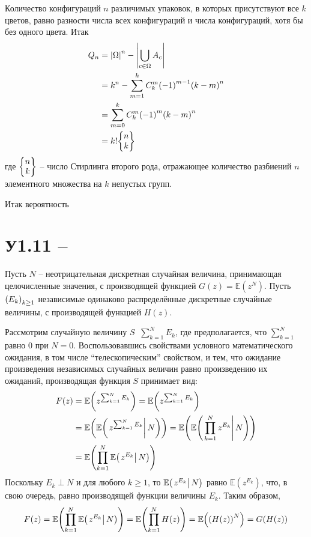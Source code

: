 \documentclass[a4paper]{article}
\let\originalleft\left
\let\originalright\right
\renewcommand{\left}{\mathopen{}\mathclose\bgroup\originalleft}
\renewcommand{\right}{\aftergroup\egroup\originalright}
\newcommand{\brac}[1]{{\left ( #1 \right )}}
\newcommand{\induc}[1]{{\left . #1 \right \vert}}
\newcommand{\abs}[1]{{\left | #1 \right |}}
\newcommand{\Ex}[0]{{\mathbb{E}}}
\newcommand{\defn}{{\mathop{\overset{\Delta}{=}}\nolimits}}
\begin{document}
Количество конфигураций $n$ различимых упаковок, в которых присутствуют все $k$ цветов,
равно разности числа всех конфигураций и числа конфигураций, хотя бы без одного цвета.
Итак
\begin{align*}
	Q_n & = \abs{\Omega}^n - \abs{ \bigcup_{c\in \Omega} A_c } \\
	& = k^n - \sum_{m=1}^k C^m_k {(-1)}^{m-1} {(k - m)}^n \\
	& = \sum_{m=0}^k C^m_k {(-1)}^m {(k - m)}^n \\
	& = k! \left\{\begin{matrix} n \\ k \end{matrix}\right\}
\end{align*}
где $\left\{\begin{matrix} n \\ k \end{matrix}\right\}$ -- число Стирлинга второго рода,
отражающее количество разбиений $n$ элементного множества на $k$ непустых групп.

Итак вероятность 





\section{У1.11 -- } %
\label{sec:task_1_11}

Пусть $N$ -- неотрицательная дискретная случайная величина, принимающая
целочисленные значения, с производящей функцией $G(z) = \Ex(z^N)$.
Пусть $\brac{E_k}_{k\geq 1}$ независимые одинаково распределённые дискретные
случайные величины, с производящей функцией $H(z)$.

Рассмотрим случайную величину $S \defn \sum_{k=1}^N E_k$, где предполагается,
что $\sum_{k=1}^N$ равно $0$ при $N=0$. Воспользовавшись свойствами условного
математического ожидания, в том числе ``телескопическим'' свойством, и тем,
что ожидание произведения независимых случайных величин равно произведению
их ожиданий, производящая функция $S$ принимает вид:
\begin{align*}
	F(z) &= \Ex\brac{ z^{\sum_{k=1}^N E_k} }
	= \Ex\brac{ z^{\sum_{k=1}^N E_k} } \\
	& = \Ex\brac{ \Ex\brac{\induc{z^{\sum_{k=1}^N E_k} }\,N} }
	= \Ex\brac{ \Ex\brac{\induc{\prod_{k=1}^N z^{E_k} }\,N} } \\
	& = \Ex\brac{ \prod_{k=1}^N \Ex\brac{\induc{z^{E_k} }\,N} }
\end{align*}
Поскольку $E_k\perp N$ и для любого $k\geq 1$, то $\Ex\brac{\induc{z^{E_k} }\,N}$
равно $\Ex(z^{E_k})$, что, в свою очередь, равно производящей функции величины $E_k$.
Таким образом,
\[F(z) = \Ex\brac{ \prod_{k=1}^N \Ex\brac{\induc{z^{E_k} }\,N} }
= \Ex\brac{ \prod_{k=1}^N H(z) } = \Ex\brac{ \brac{H(z)}^N } = G\brac{H(z)}\]
\end{document}
